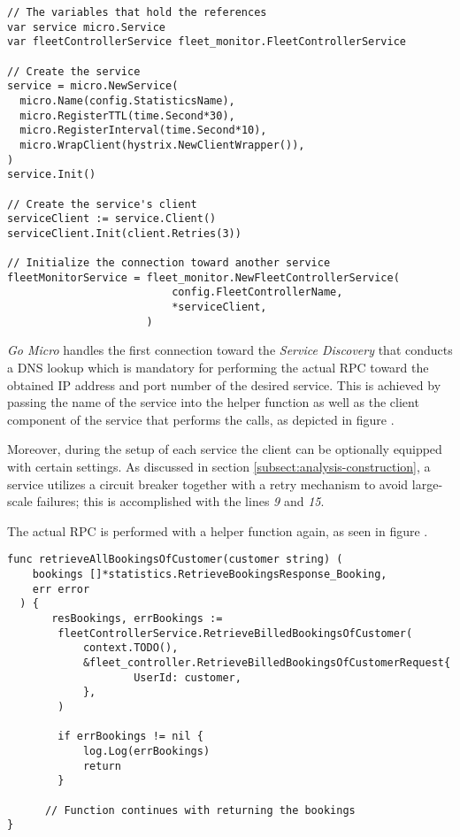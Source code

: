 \documentclass[12pt,a4paper,twoside]{report}
\begin{document}
\begin{lstlisting}[title=services/statistics/main.go, float, floatplacement=H]
// The variables that hold the references
var service micro.Service
var fleetControllerService fleet_monitor.FleetControllerService

// Create the service
service = micro.NewService(
  micro.Name(config.StatisticsName),
  micro.RegisterTTL(time.Second*30),
  micro.RegisterInterval(time.Second*10),
  micro.WrapClient(hystrix.NewClientWrapper()),
)
service.Init()

// Create the service's client
serviceClient := service.Client()
serviceClient.Init(client.Retries(3))

// Initialize the connection toward another service
fleetMonitorService = fleet_monitor.NewFleetControllerService(
                          config.FleetControllerName,
                          *serviceClient,
                      )
\end{lstlisting}

\textit{Go Micro} handles the first connection toward the
\textit{Service Discovery} that conducts a DNS lookup which is mandatory
for performing the actual RPC toward the obtained IP address and port number
of the desired service.
This is achieved by passing the name of the service into the helper function
as well as the client component of the service that performs the calls, as depicted
in figure .

Moreover, during the setup of each service the client can be optionally equipped
with certain settings. As discussed in section \ref{subsect:analysis-construction},
a service utilizes a circuit breaker together with a retry mechanism to
avoid large-scale failures; this is accomplished with
the lines \textit{9} and \textit{15}.

The actual RPC is performed with a helper function again, as seen
in figure .

\begin{lstlisting}[title=services/statistics/bookings.go, float, floatplacement=H]
func retrieveAllBookingsOfCustomer(customer string) (
    bookings []*statistics.RetrieveBookingsResponse_Booking,
    err error
  ) {
	   resBookings, errBookings :=
        fleetControllerService.RetrieveBilledBookingsOfCustomer(
            context.TODO(),
            &fleet_controller.RetrieveBilledBookingsOfCustomerRequest{
    		        UserId: customer,
    	    },
        )

    	if errBookings != nil {
    		log.Log(errBookings)
    		return
    	}

      // Function continues with returning the bookings
}
\end{lstlisting}
\end{document}
